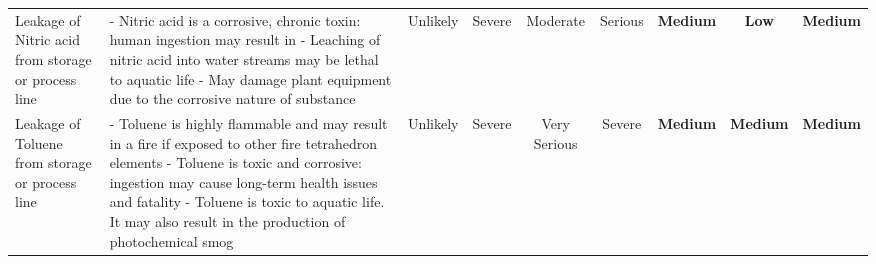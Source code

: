 \begin{table}
\begin{tabularx}{\linewidth}{|p{3cm}|X|c|c|c|c|c|c|c|}
Leakage of Nitric  acid from storage  or process line                        & - Nitric acid is a corrosive, chronic toxin: human ingestion may result in - Leaching of nitric acid into water streams may  be lethal to aquatic life - May damage plant equipment due to the corrosive  nature of substance                                                                                                                & Unlikely                              & Severe                                                        & Moderate                                                        & Serious                                                               & \cellcolor[HTML]{FCFF2F}\textbf{Medium}                       & \cellcolor[HTML]{34FF34}\textbf{Low}                            & \cellcolor[HTML]{FCFF2F}\textbf{Medium}                                 \\
Leakage of Toluene  from storage  or process line                            & - Toluene is highly flammable and may result in a     fire if exposed to other fire tetrahedron elements - Toluene is toxic and corrosive: ingestion may     cause long-term health issues and fatality   - Toluene is toxic to aquatic life. It may also result  in  the production of photochemical smog                                   & Unlikely                              & Severe                                                        & Very  Serious         & Severe                                                                & \cellcolor[HTML]{FCFF2F}\textbf{Medium}                       & \cellcolor[HTML]{FCFF2F}\textbf{Medium}                         & \cellcolor[HTML]{FCFF2F}\textbf{Medium}                                 
\end{tabularx}
\end{table}


